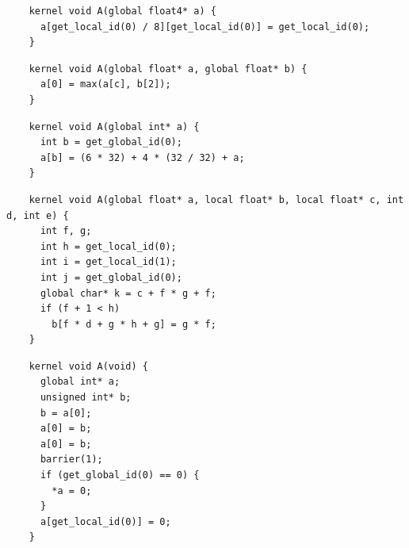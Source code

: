 \newsavebox{\BeignetScalarizeInsert}
\begin{lrbox}{\BeignetScalarizeInsert}
  \hspace{1.5em}
  \begin{lstlisting}
    kernel void A(global float4* a) {
      a[get_local_id(0) / 8][get_local_id(0)] = get_local_id(0);
    }
  \end{lstlisting}
\end{lrbox}

\newsavebox{\OclgrindUncorrectedTypos}
\begin{lrbox}{\OclgrindUncorrectedTypos}
  \hspace{1.5em}
  \begin{lstlisting}
    kernel void A(global float* a, global float* b) {
      a[0] = max(a[c], b[2]);
    }
  \end{lstlisting}
\end{lrbox}

\newsavebox{\BeignetPtrIntSpin}
\begin{lrbox}{\BeignetPtrIntSpin}
  \hspace{1.5em}
  \begin{lstlisting}
    kernel void A(global int* a) {
      int b = get_global_id(0);
      a[b] = (6 * 32) + 4 * (32 / 32) + a;
    }
  \end{lstlisting}
\end{lrbox}

\newsavebox{\NvidiaCompileSegfault}
\begin{lrbox}{\NvidiaCompileSegfault}
  \hspace{1.5em}
  \begin{lstlisting}
    kernel void A(global float* a, local float* b, local float* c, int d, int e) {
      int f, g;
      int h = get_local_id(0);
      int i = get_local_id(1);
      int j = get_global_id(0);
      global char* k = c + f * g + f;
      if (f + 1 < h)
        b[f * d + g * h + g] = g * f;
    }
  \end{lstlisting}
\end{lrbox}

\newsavebox{\XeonPhiSegfault}
\begin{lrbox}{\XeonPhiSegfault}
  \hspace{1.5em}
  \begin{lstlisting}
    kernel void A(void) {
      global int* a;
      unsigned int* b;
      b = a[0];
      a[0] = b;
      a[0] = b;
      barrier(1);
      if (get_global_id(0) == 0) {
        *a = 0;
      }
      a[get_local_id(0)] = 0;
    }
  \end{lstlisting}
\end{lrbox}

